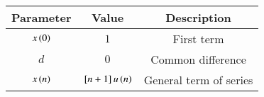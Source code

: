 \begin{tabular}{|c|c|c|}
\hline
Parameter & Value & Description \\
\hline
$x\left(0\right)$ & $1$ & First term\\
\hline
$d$ & $0$ & Common difference\\
\hline
$x\left(n\right)$ & ${}\left[n+1\right]u\left(n\right)$ & General  term of series \\
\hline
\end{tabular}
